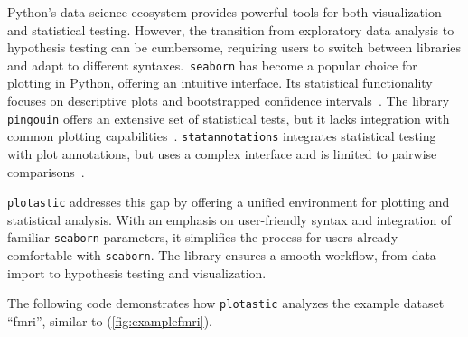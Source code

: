 %
\label{sec:C2_need}%
Python's data science ecosystem provides powerful tools for both visualization
and statistical testing. However, the transition from exploratory data analysis
to hypothesis testing can be cumbersome, requiring users to switch between
libraries and adapt to different syntaxes.~\texttt{seaborn} has become a popular
choice for plotting in Python, offering an intuitive interface. Its statistical
functionality focuses on descriptive plots and bootstrapped confidence
intervals~\cite{waskomSeabornStatisticalData2021}. The library \texttt{pingouin}
offers an extensive set of statistical tests, but it lacks integration with
common plotting capabilities~\cite{vallatPingouinStatisticsPython2018}.
\texttt{statannotations} integrates statistical testing with plot annotations,
but uses a complex interface and is limited to pairwise
comparisons~\cite{charlierTrevismdStatannotationsV02022}.

\texttt{plotastic} addresses this gap by offering a unified environment for
plotting and statistical analysis. With an emphasis on user-friendly
syntax and integration of familiar \texttt{seaborn} parameters, it simplifies
the process for users already comfortable with \texttt{seaborn}. The library
ensures a smooth workflow, from data import to hypothesis testing and
visualization.



\newpage



%
\label{sec:C2_example}%
The following code demonstrates how \texttt{plotastic} analyzes the
example dataset ``fmri'', similar to \citet{waskomSeabornStatisticalData2021}
(\autoref{fig:examplefmri}).

